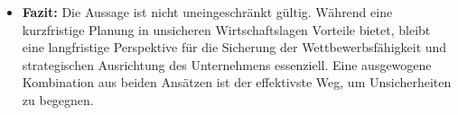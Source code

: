{\begin{itemize}
    \item \textbf{Fazit:}
    Die Aussage ist nicht uneingeschränkt gültig. Während eine kurzfristige Planung in unsicheren Wirtschaftslagen Vorteile bietet, bleibt eine langfristige Perspektive für die Sicherung der Wettbewerbsfähigkeit und strategischen Ausrichtung des Unternehmens essenziell. Eine ausgewogene Kombination aus beiden Ansätzen ist der effektivste Weg, um Unsicherheiten zu begegnen.
\end{itemize}
}

